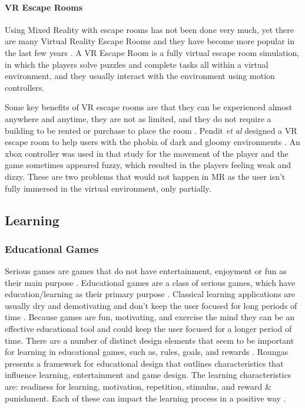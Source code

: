 \documentclass[journal]{IEEEtran}
\begin{document}
\paragraph{VR Escape Rooms} \label{VR Escape Rooms}
Using Mixed Reality with escape rooms has not been done very much, yet there are many Virtual Reality Escape Rooms and they have become more popular in the last few years \cite{andy_odonnell_10_nodate}. A VR Escape Room is a fully virtual escape room simulation, in which the players solve puzzles and complete tasks all within a virtual environment, and they usually interact with the environment using motion controllers.

Some key benefits of VR escape rooms are that they can be experienced almost anywhere and anytime, they are not as limited, and they do not require a building to be rented or purchase to place the room \cite{pendit_virtual_2017}. Pendit \textit{et al} designed a VR escape room to help users with the phobia of dark and gloomy environments \cite{pendit_virtual_2017}. An xbox controller was used in that study for the movement of the player and the game sometimes appeared fuzzy, which resulted in the players feeling weak and dizzy. These are two problems that would not happen in MR as the user isn't fully immersed in the virtual environment, only partially. 

\subsection{Learning}
\subsubsection{Educational Games}
Serious games are games that do not have entertainment, enjoyment or fun as their main purpose \cite{michael_serious_nodate, ma_origins_2011}. Educational games are a class of serious games, which have  education/learning as their primary purpose \cite{roungas_model-driven_2016}. Classical learning applications are usually dry and demotivating and don't keep the user focused for long periods of time \cite{wagner_augmented_2003}. Because games are fun, motivating, and exercise the mind they can be an effective educational tool \cite{paiva_ilearntest_2016} and could keep the user focused for a longer period of time. There are a number of distinct design elements that seem to be important for learning in educational games, such as, rules, goals, and rewards \cite{dondlinger_educational_2007}. Roungas \cite{roungas_model-driven_2016} presents a framework for educational design that outlines characteristics that influence learning, entertainment and game design. The learning characteristics are: readiness for learning, motivation, repetition, stimulus, and reward \& punishment. Each of these can impact the learning process in a positive way \cite{roungas_model-driven_2016}.
\end{document}
